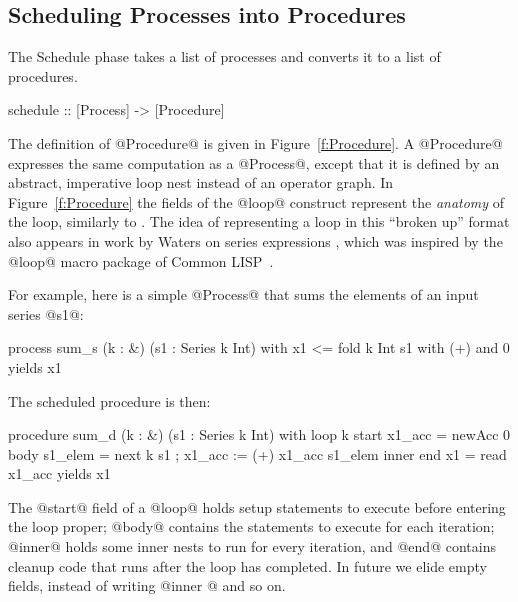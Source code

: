 



\subsection{Scheduling Processes into Procedures}
\label{s:SchedulingLoops}
The Schedule phase takes a list of processes and converts it to a list of procedures.
%
\begin{code}
  schedule    :: [Process] -> [Procedure]
\end{code}

The definition of @Procedure@ is given in Figure~\ref{f:Procedure}. A @Procedure@ expresses the same computation as a @Process@, except that it is defined by an abstract, imperative loop nest instead of an operator graph. In Figure~\ref{f:Procedure} the fields of the @loop@ construct represent the \emph{anatomy} of the loop, similarly to \cite{Shivers:anatomy-of-a-loop}. The idea of representing a loop in this ``broken up'' format also appears in work by Waters on series expressions \cite{Waters:series-expressions, Waters:series-expressions-interpretation}, which was inspired by the @loop@ macro package of Common LISP~\cite{Steele:lisp}. 

For example, here is a simple @Process@ that sums the elements of an input series @s1@:
%
\begin{code}
 process sum_s (k : &) (s1 : Series k Int)
  with { x1 <= fold k Int s1 with (+) and 0 }
  yields x1
\end{code}


\eject
\noindent
The scheduled procedure is then:
%
\begin{code}
 procedure sum_d (k : &) (s1 : Series k Int) 
  with loop k
       start { x1_acc   = newAcc 0 }
       body  { s1_elem  = next k s1
             ; x1_acc  := (+) x1_acc s1_elem }
       inner {}
       end   { x1       = read x1_acc }
  yields x1
\end{code}

The @start@ field of a @loop@ holds setup statements to execute before entering the loop proper; @body@ contains the statements to execute for each iteration; @inner@ holds some inner nests to run for every iteration, and @end@ contains cleanup code that runs after the loop has completed. In future we elide empty fields, instead of writing @inner {}@ and so on.


